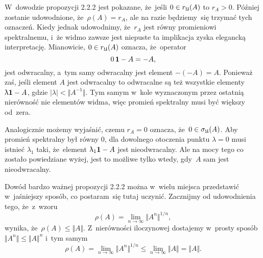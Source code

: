 \documentclass[a4paper,11pt]{article}
\begin{document}
\noindent
{} W~dowodzie propozycji 2.2.2 jest pokazane, że~jeśli
$0 \in r_{ \mathfrak{U} }( A )$ to $r_{ A } > 0$. Później zostanie udowodnione,
że~$\rho( A ) = r_{ A }$, ale na razie będziemy~się trzymać tych oznaczeń.
Kiedy jednak udowodnimy, że~$r_{ A }$ jest równy promieniowi spektralnemu,
i~że widmo zawsze jest niepuste ta implikacja zyska elegancką interpretację.
Mianowicie, $0 \in r_{ \mathfrak{U} }( A )$ oznacza, że~operator
\begin{equation}
  \label{eq:Bratteli-Robinson-Operator-Algebras-ETC-Vol-I-s01-25}
  0 \, \mathbf{1} - A = -A,
\end{equation}
jest odwracalny, a~tym samy odwracalny jest element $-( -A ) = A$. Ponieważ
zaś, jeśli element $A$ jest odwracalny to odwracalne są też wszystkie
elementy $\uplambda \mathbf{1} - A$, gdzie $| \lambda | < \Vert A^{ -1 } \Vert$. Tym samym w~kole
wyznaczonym przez ostatnią nierówność nie elementów widma, więc promień
spektralny musi być większy od~zera.

Analogicznie możemy wyjaśnić, czemu $r_{ A } = 0$ oznacza,
że~$0 \in \sigma_{ \mathfrak{U} }( A )$. Aby promień spektralny był równy $0$, dla
dowolnego otoczenia punktu $\lambda = 0$ musi istnieć $\lambda_{ 1 }$ taki,
że~element $\uplambda_{ 1 } \mathbf{1} - A$ jest nieodwracalny. Ale na mocy tego co
zostało powiedziane wyżej, jest to możliwe tylko wtedy, gdy~$A$ sam jest
nieodwracalny.

\vspace{\VerSpaceFour}





\noindent
{} Dowód bardzo ważnej propozycji 2.2.2 można w~wielu miejsca
przedstawić w~jaśniejszy sposób, co postaram~się tutaj uczynić. Zacznijmy od
udowodnienia tego, że~z~wzoru
\begin{equation}
  \label{eq:Bratteli-Robinson-Operator-Algebras-ETC-Vol-I-s01-26}
  \rho( A ) = \lim_{ n \to \infty } \Vert A^{ n } \Vert^{ 1 / n },
\end{equation}
wynika, że~$\rho( A ) \leq \Vert A \Vert$. Z~nierówności iloczynowej dostajemy w~prosty
sposób $\Vert A^{ n } \Vert \leq \Vert A \Vert^{ n }$ i~tym samym
\begin{equation}
  \label{eq:Bratteli-Robinson-Operator-Algebras-ETC-Vol-I-s01-27}
  \rho( A ) =
  \lim_{ n \to \infty } \Vert A^{ n } \Vert^{ 1 / n } \leq
  \lim_{ n \to \infty } \Vert A \Vert = \Vert A \Vert.
\end{equation}
\end{document}
